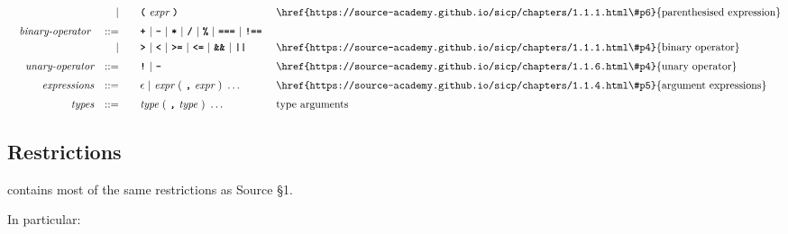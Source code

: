 \begin{alignat*}{9}
&&                       && |   &\quad &&  \textbf{\texttt{(}}\  \textit{expr} \ 
                                            \textbf{\texttt{)}} && \textrm{\href{https://source-academy.github.io/sicp/chapters/1.1.1.html\#p6}{parenthesised expression}}\\[1mm]
&& \textit{binary-operator}    \ 
                        && ::= &\quad && \textbf{\texttt{+}}\ |\ \textbf{\texttt{-}}\ |\ \textbf{\texttt{*}}\ |\ \textbf{\texttt{/}}\ |\ \textbf{\texttt{\%}}\ |\ 
                                   \textbf{\texttt{===}}\ |\ \textbf{\texttt{!==}}\ \\
&&                       && |  &\quad &&  \texttt{\textbf{>}}\ |\ \texttt{\textbf{<}}\ |\ \texttt{\textbf{>=}}\ |\ \texttt{\textbf{<=}}\
                                          |\ \textbf{\texttt{\&\&}}\ |\ \texttt{\textbf{||}}
                                          && \textrm{\href{https://source-academy.github.io/sicp/chapters/1.1.1.html\#p4}{binary operator}}\\[1mm]
&& \textit{unary-operator}    
                        && ::= &\quad && \textbf{\texttt{!}}\ |\ \textbf{\texttt{-}}
                        && \textrm{\href{https://source-academy.github.io/sicp/chapters/1.1.6.html\#p4}{unary operator}}\\[1mm]
&& \textit{expressions}  && ::= &\quad && \epsilon\ | \ \textit{expr}\ (
                                                               \ \textbf{\texttt{,}} \
                                                                 \textit{expr} \ 
                                                                      )\ \ldots
                                                            && \textrm{\href{https://source-academy.github.io/sicp/chapters/1.1.4.html\#p5}{argument expressions}} \\[1mm]
&& \textit{types}  && ::= &\quad && \textit{type}\ (\ \textbf{\texttt{,}} \ \textit{type} \ )\ \ldots
                                                            && \textrm{type arguments} 
\end{alignat*}

\newpage


\subsection*{Restrictions}

\DynamicTS{} contains most of the same restrictions as Source \S 1. 

In particular:

